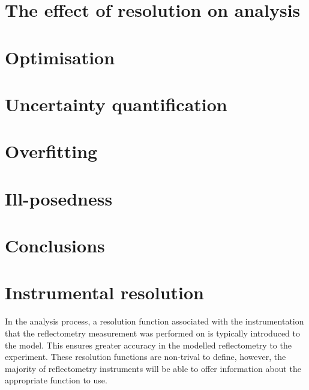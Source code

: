 \documentclass[
 reprint,
 superscriptaddress,
 amsmath,amssymb,
 aps,
]{revtex4-1}
\begin{document}

\section{The effect of resolution on analysis}


\section{Optimisation}



\section{Uncertainty quantification}



\section{Overfitting}

\section{Ill-posedness}


\section{Conclusions}


\section{Instrumental resolution}
In the analysis process, a resolution function associated with the instrumentation that the reflectometry measurement was performed on is typically introduced to the model.
This ensures greater accuracy in the modelled reflectometry to the experiment.
These resolution functions are non-trival to define, however, the majority of reflectometry instruments will be able to offer information about the appropriate function to use.
\end{document}
